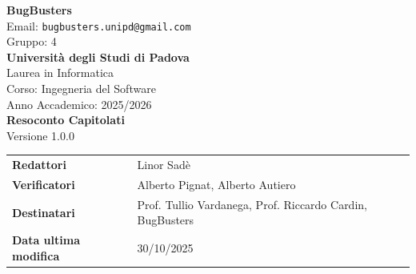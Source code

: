 \documentclass[a4paper,11pt]{article}
\newcommand{\CurrentVersion}{1.0.0} %
\begin{document}
\pagestyle{fancy}
\fancyhf{} %


\fancyfoot[R]{ \nouppercase{\rightmark}} %


\renewcommand{\headrulewidth}{0pt} %
\renewcommand{\footrulewidth}{0pt} %


\begin{center}
 \thispagestyle{empty}
 {\Large\bfseries BugBusters}\\[0.3cm]
 {\small\color{darkgray} Email: \texttt{bugbusters.unipd@gmail.com}} \\[0.1cm]
 {\small\color{darkgray} Gruppo: 4} \\[0.5cm]

 {\large\bfseries Università degli Studi di Padova}\\[0.3cm]
 {\small Laurea in Informatica}\\[0.2cm]
 {\small Corso: Ingegneria del Software}\\[0.2cm]
 {\small Anno Accademico: 2025/2026}\\[0.8cm]

 {\Huge\bfseries\color{primaryblue} Resoconto Capitolati}\\[0.8cm]
 {\Large\color{secondaryblue}Versione \CurrentVersion}\\[0.8cm]
\end{center}

\begin{center}
\begin{tcolorbox}[colback=lightgray,colframe=primaryblue,width=0.85\textwidth,arc=3mm,boxrule=0.5pt]
\begin{tabularx}{\linewidth}{@{}lX@{}}
\textbf{Redattori} & Linor Sadè \\
\textbf{Verificatori} & Alberto Pignat, Alberto Autiero \\
\textbf{Destinatari} & Prof. Tullio Vardanega, Prof. Riccardo Cardin, BugBusters \\
\textbf{Data ultima modifica}     & 30/10/2025 \\
\end{tabularx}
\end{tcolorbox}
\end{center}
\end{document}
